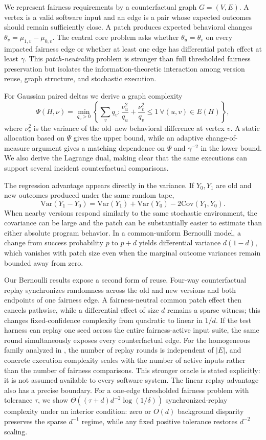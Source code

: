We represent fairness requirements by a counterfactual graph $G=(V,E)$.  A vertex
is a valid software input and an edge is a pair whose expected outcomes should
remain sufficiently close.  A patch produces expected behavioral changes
$\theta_v=\mu_{1,v}-\mu_{0,v}$.  The central core problem asks whether
$\theta_u=\theta_v$ on every impacted fairness edge or whether at least one edge
has differential patch effect at least $\gamma$.  This \emph{patch-neutrality}
problem is stronger than full thresholded fairness preservation but isolates the
information-theoretic interaction among version reuse, graph structure, and
stochastic execution.

For Gaussian paired deltas we derive a graph complexity
\[
\Psi(H,\nu)=
\min_{q_v>0}\left\{
\sum_v q_v:
\frac{\nu_u^2}{q_u}+\frac{\nu_v^2}{q_v}\le1
\ \forall (u,v)\in E(H)
\right\},
\]
where $\nu_v^2$ is the variance of the old--new behavioral difference at vertex
$v$.  A static allocation based on $\Psi$ gives the upper bound, while an adaptive
change-of-measure argument gives a matching dependence on $\Psi$ and
$\gamma^{-2}$ in the lower bound.  We also derive the Lagrange dual, making clear
that the same executions can support several incident counterfactual comparisons.

The regression advantage appears directly in the variance.  If $Y_0,Y_1$ are old
and new outcomes produced under the same random tape,
\[
\mathrm{Var}(Y_1-Y_0)
=
\mathrm{Var}(Y_1)+\mathrm{Var}(Y_0)-2\mathrm{Cov}(Y_1,Y_0).
\]
When nearby versions respond similarly to the same stochastic environment, the
covariance can be large and the patch can be substantially easier to estimate
than either absolute program behavior.  In a common-uniform Bernoulli model, a
change from success probability $p$ to $p+d$ yields differential variance
$d(1-d)$, which vanishes with patch size even when the marginal outcome variances
remain bounded away from zero.


Our Bernoulli results expose a second form of reuse.  Four-way counterfactual
replay synchronizes randomness across the old and new versions and both endpoints
of one fairness edge.  A fairness-neutral common patch effect then cancels
pathwise, while a differential effect of size \(d\) remains a sparse witness;
this changes fixed-confidence complexity from quadratic to linear in \(1/d\).
If the test harness can replay one seed across the entire fairness-active input
suite, the same round simultaneously exposes every counterfactual edge.  For the
homogeneous family analyzed in , the number of replay
rounds is independent of \(|E|\), and concrete execution complexity scales with
the number of active inputs rather than the number of fairness comparisons.
This stronger oracle is stated explicitly: it is not assumed available to every
software system.  The linear replay advantage also has a precise boundary.
For a one-edge thresholded fairness problem with tolerance $\tau$, we show
$\Theta((\tau+d)d^{-2}\log(1/\delta))$ synchronized-replay complexity under
an interior condition: zero or $O(d)$ background disparity preserves the sparse
$d^{-1}$ regime, while any fixed positive tolerance restores $d^{-2}$ scaling.

